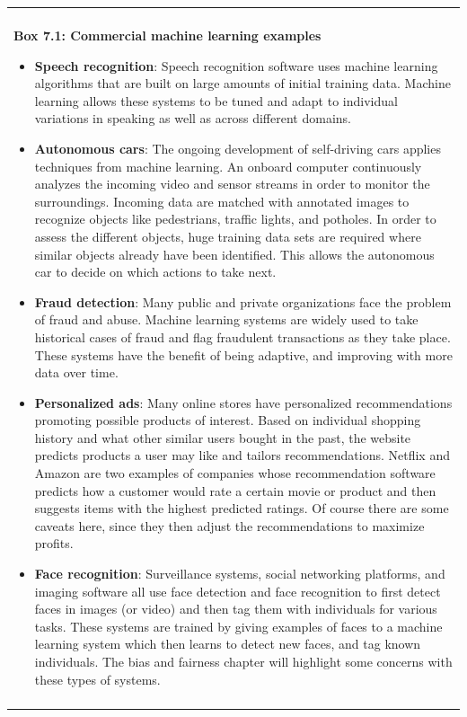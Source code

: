 \documentclass[]{krantz}
\newenvironment{F00}
    {\begin{center}
    \begin{tabular}{|p{0.9\textwidth}|}
    \hline\\
    }
    { 
    \\\\\hline
    \end{tabular} 
    \end{center}
    }
\begin{document}
\begin{F00}
\textbf{Box 7.1: Commercial machine learning examples}

\begin{itemize}
\item
  \textbf{Speech recognition}: Speech recognition software uses machine
  learning algorithms that are built on large amounts of initial
  training data. Machine learning allows these systems to be tuned and
  adapt to individual variations in speaking as well as across different
  domains.
\item
  \textbf{Autonomous cars}: The ongoing development of self-driving cars
  applies techniques from machine learning. An onboard computer
  continuously analyzes the incoming video and sensor streams in order
  to monitor the surroundings. Incoming data are matched with annotated
  images to recognize objects like pedestrians, traffic lights, and
  potholes. In order to assess the different objects, huge training data
  sets are required where similar objects already have been identified.
  This allows the autonomous car to decide on which actions to take
  next.
\item
  \textbf{Fraud detection}: Many public and private organizations face
  the problem of fraud and abuse. Machine learning systems are widely
  used to take historical cases of fraud and flag fraudulent
  transactions as they take place. These systems have the benefit of
  being adaptive, and improving with more data over time.
\item
  \textbf{Personalized ads}: Many online stores have personalized
  recommendations promoting possible products of interest. Based on
  individual shopping history and what other similar users bought in the
  past, the website predicts products a user may like and tailors
  recommendations. Netflix and Amazon are two examples of companies
  whose recommendation software predicts how a customer would rate a
  certain movie or product and then suggests items with the highest
  predicted ratings. Of course there are some caveats here, since they
  then adjust the recommendations to maximize profits.
\item
  \textbf{Face recognition}: Surveillance systems, social networking
  platforms, and imaging software all use face detection and face
  recognition to first detect faces in images (or video) and then tag
  them with individuals for various tasks. These systems are trained by
  giving examples of faces to a machine learning system which then
  learns to detect new faces, and tag known individuals. The bias and
  fairness chapter will highlight some concerns with these types of
  systems.
\end{itemize}
\end{F00}
\end{document}
